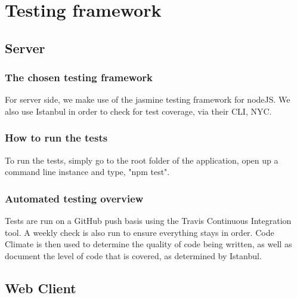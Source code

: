 \documentclass[a4paper,12pt]{article}
\begin{document}
    \pagebreak
    
    \section{Testing framework}
    
    	\subsection{Server}
    	
	    	\subsubsection{The chosen testing framework}
	    	
	    	For server side, we make use of the jasmine testing framework for nodeJS. We also use Istanbul in order to check for test coverage, via their CLI, NYC.
	    	
	        \subsubsection{How to run the tests}
	        
	        To run the tests, simply go to the root folder of the application, open up a command line instance and type, "npm test".
	        
	        \subsubsection{Automated testing overview}
	        
	        Tests are run on a GitHub push basis using the Travis Continuous Integration tool. A weekly check is also run to ensure everything stays in order. Code Climate is then used to determine the quality of code being written, as well as document the level of code that is covered, as determined by Istanbul.
	        
	    \subsection{Web Client}
	    
\end{document}
